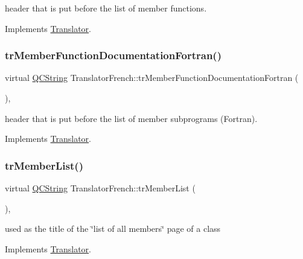 header that is put before the list of member functions. 

Implements \mbox{\hyperlink{class_translator}{Translator}}.

\mbox{\label{class_translator_french_a8cfa73a163c5f93603c67277fed56a42}} 
\subsubsection{\texorpdfstring{trMemberFunctionDocumentationFortran()}{trMemberFunctionDocumentationFortran()}}
{\footnotesize\ttfamily virtual \mbox{\hyperlink{class_q_c_string}{Q\+C\+String}} Translator\+French\+::tr\+Member\+Function\+Documentation\+Fortran (\begin{DoxyParamCaption}{ }\end{DoxyParamCaption})\hspace{0.3cm}{\ttfamily [inline]}, {\ttfamily [virtual]}}

header that is put before the list of member subprograms (Fortran). 

Implements \mbox{\hyperlink{class_translator}{Translator}}.

\mbox{\label{class_translator_french_ae5ea46a0fe7c9b88bd3ea95516c00430}} 
\subsubsection{\texorpdfstring{trMemberList()}{trMemberList()}}
{\footnotesize\ttfamily virtual \mbox{\hyperlink{class_q_c_string}{Q\+C\+String}} Translator\+French\+::tr\+Member\+List (\begin{DoxyParamCaption}{ }\end{DoxyParamCaption})\hspace{0.3cm}{\ttfamily [inline]}, {\ttfamily [virtual]}}

used as the title of the \char`\"{}list of all members\char`\"{} page of a class 

Implements \mbox{\hyperlink{class_translator}{Translator}}.

